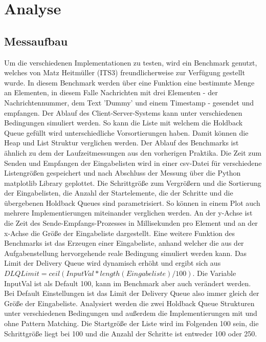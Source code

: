 \section{Analyse}

\subsection{Messaufbau}

Um die verschiedenen Implementationen zu testen, wird ein Benchmark genutzt, welches von Matz Heitmüller (ITS3) freundlicherweise zur Verfügung gestellt wurde. 
In diesem Benchmark werden über eine Funktion eine bestimmte Menge an Elementen, in diesem Falle Nachrichten mit drei Elementen - der Nachrichtennummer, dem Text 'Dummy' und einem Timestamp - gesendet und empfangen. Der Ablauf des Client-Server-Systems kann unter verschiedenen Bedingungen simuliert werden. 
So kann die Liste mit welchem die Holdback Queue gefüllt wird unterschiedliche Vorsortierungen haben. Damit können die Heap und List Struktur verglichen werden.
Der Ablauf des Benchmarks ist ähnlich zu dem der Laufzeitmessungen aus den vorherigen Praktika. Die Zeit zum Senden und Empfangen der Eingabelisten wird in einer csv-Datei für verschiedene Listengrößen gespeichert und nach Abschluss der Messung über die Python matplotlib Library geplottet.
Die Schrittgröße zum Vergrößern und die Sortierung der Eingabelisten, die Anzahl der Startelemente, die der Schritte und die übergebenen Holdback Queues sind parametrisiert. So können in einem Plot auch mehrere Implementierungen miteinander verglichen werden. An der y-Achse ist die Zeit des Sende-Empfangs-Prozesses in Millisekunden pro Element und an der x-Achse die Größe der Eingabeliste dargestellt. 
Eine weitere Funktion des Benchmarks ist das Erzeugen einer Eingabeliste, anhand welcher die aus der Aufgabenstellung hervorgehende reale Bedingung simuliert werden kann.
Das Limit der Delivery Queue wird dynamisch erhöht und ergibt sich aus $DLQLimit = ceil(InputVal * length(Eingabeliste) / 100)$. Die Variable InputVal ist als Default 100, kann im Benchmark aber auch verändert werden. Bei Default Einstellungen ist das Limit der Delivery Queue also immer gleich der Größe der Eingabeliste. 
Analysiert werden die zwei Holdback Queue Strukturen unter verschiedenen Bedingungen und außerdem die Implementierungen mit und ohne Pattern Matching. 
Die Startgröße der Liste wird im Folgenden 100 sein, die Schrittgröße liegt bei 100 und die Anzahl der Schritte ist entweder 100 oder 250.\\ 
\\

